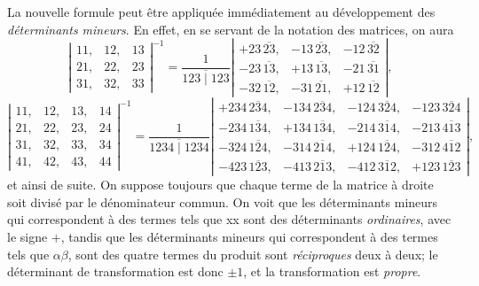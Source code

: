 \documentclass[11pt,a4paper]{article}
\begin{document}
La nouvelle formule peut \^etre appliqu\'ee imm\'ediatement au d\'eveloppement des \textit{d\'eterminants mineurs}. En effet, en se servant de la notation des matrices, on aura
\[
\left\lvert\begin{array}{ccc}
11, & 12, & 13\\
21, & 22, & 23\\
31, & 32, & 33
\end{array}\right\rvert^{-1} =
\frac{1}{\overline{123 \mid 123}}
\left\lvert\begin{array}{ccc}
+23\,\overline{23}, & -13\,\overline{23}, & -12\,\overline{32}\\
-23\,\overline{13}, & +13\,\overline{13}, & -21\,\overline{31}\\
-32\,\overline{12}, & -31\,\overline{21}, & +12\,\overline{12}
\end{array}\right\rvert ,
\]
\[
\left\lvert\begin{array}{cccc}
11, & 12, & 13, & 14\\
21, & 22, & 23, & 24\\
31, & 32, & 33, & 34\\
41, & 42, & 43, & 44
\end{array}\right\rvert^{-1} =
\frac{1}{\overline{1234 \mid 1234}}
\left\lvert\begin{array}{cccc}
+234\,\overline{234}, & -134\,\overline{234}, & -124\,\overline{324}, & -123\,\overline{324}\\
-234\,\overline{134}, & +134\,\overline{134}, & -214\,\overline{314}, & -213\,\overline{413}\\
-324\,\overline{124}, & -314\,\overline{214}, & +124\,\overline{124}, & -312\,\overline{412}\\
-423\,\overline{123}, & -413\,\overline{213}, & -412\,\overline{312}, & +123\,\overline{123}
\end{array}\right\rvert ,
\]
et ainsi de suite. On suppose toujours que chaque terme de la matrice \`a droite soit divis\'e par le d\'enominateur commun. On voit que les d\'eterminants mineurs qui correspondent \`a des termes tels que xx sont des d\'eterminants \textit{ordinaires}, avec le signe $+$, tandis que les d\'eterminants mineurs qui correspondent \`a des termes tels que $\alpha\beta$, sont des quatre termes du produit sont \textit{r\'eciproques} deux \`a deux; le d\'eterminant de transformation est donc $\pm 1$, et la transformation est \textit{propre}.

\medskip

\end{document}
